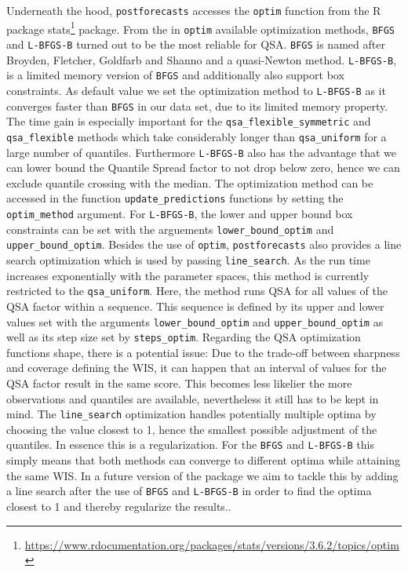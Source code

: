 \documentclass[
]{article}
\DeclareRobustCommand{\href}[2]{#2\footnote{\url{#1}}}
\begin{document}
Underneath the hood, \texttt{postforecasts} accesses the \texttt{optim} function from the R package \href{https://www.rdocumentation.org/packages/stats/versions/3.6.2/topics/optim}{stats} package. From the in \texttt{optim} available optimization methods, \texttt{BFGS} and \texttt{L-BFGS-B} turned out to be the most reliable for QSA. \texttt{BFGS} is named after Broyden, Fletcher, Goldfarb and Shanno and a quasi-Newton method. \texttt{L-BFGS-B}, is a limited memory version of \texttt{BFGS} and additionally also support box constraints. As default value we set the optimization method to \texttt{L-BFGS-B} as it converges faster than \texttt{BFGS} in our data set, due to its limited memory property. The time gain is especially important for the \texttt{qsa\_flexible\_symmetric} and \texttt{qsa\_flexible} methods which take considerably longer than \texttt{qsa\_uniform} for a large number of quantiles. Furthermore \texttt{L-BFGS-B} also has the advantage that we can lower bound the Quantile Spread factor to not drop below zero, hence we can exclude quantile crossing with the median. The optimization method can be accessed in the function \texttt{update\_predictions} functions by setting the \texttt{optim\_method} argument. For \texttt{L-BFGS-B}, the lower and upper bound box constraints can be set with the arguements \texttt{lower\_bound\_optim} and \texttt{upper\_bound\_optim}.
Besides the use of \texttt{optim}, \texttt{postforecasts} also provides a line search optimization which is used by passing \texttt{line\_search}. As the run time increases exponentially with the parameter spaces, this method is currently restricted to the \texttt{qsa\_uniform}. Here, the method runs QSA for all values of the QSA factor within a sequence. This sequence is defined by its upper and lower values set with the arguments \texttt{lower\_bound\_optim} and \texttt{upper\_bound\_optim} as well as its step size set by \texttt{steps\_optim}.
Regarding the QSA optimization functions shape, there is a potential issue: Due to the trade-off between sharpness and coverage defining the WIS, it can happen that an interval of values for the QSA factor result in the same score. This becomes less likelier the more observations and quantiles are available, nevertheless it still has to be kept in mind. The \texttt{line\_search} optimization handles potentially multiple optima by choosing the value closest to 1, hence the smallest possible adjustment of the quantiles. In essence this is a regularization. For the \texttt{BFGS} and \texttt{L-BFGS-B} this simply means that both methods can converge to different optima while attaining the same WIS. In a future version of the package we aim to tackle this by adding a line search after the use of \texttt{BFGS} and \texttt{L-BFGS-B} in order to find the optima closest to 1 and thereby regularize the results..
\end{document}

